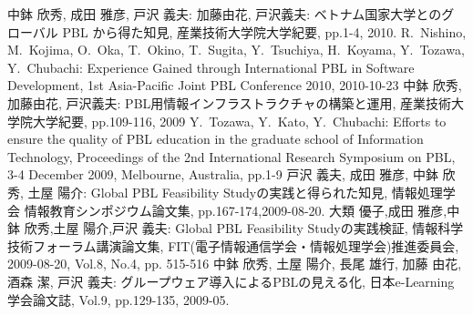 \documentclass[a4j,9pt,twoside,twocolumn]{jsarticle}
\newcommand{\me}{中鉢 欣秀}
\newcommand{\meen}{Y.~Chubachi}
\begin{document}
\begin{thebibliography}{99}
		 \me, 成田 雅彦, 戸沢 義夫: 加藤由花, 戸沢義夫: ベトナム国家大学とのグローバル PBL から得た知見, 産業技術大学院大学紀要, pp.1-4, 2010. 
		 R.~Nishino, M.~Kojima, O.~Oka, T.~Okino, T.~Sugita, Y.~Tsuchiya, H.~Koyama, Y.~Tozawa, \meen: Experience Gained through International PBL in Software Development, 1st Asia-Pacific Joint PBL Conference 2010, 2010-10-23
		 \me, 加藤由花, 戸沢義夫: PBL用情報インフラストラクチャの構築と運用, 産業技術大学院大学紀要, pp.109-116, 2009
		 Y.~Tozawa, Y.~Kato, \meen: Efforts to ensure the quality of PBL education in the graduate school of Information Technology, Proceedings of the 2nd International Research Symposium on PBL, 3-4 December 2009, Melbourne, Australia, pp.1-9
		 戸沢 義夫, 成田 雅彦, \me, 土屋 陽介: Global PBL Feasibility Studyの実践と得られた知見, 情報処理学会 情報教育シンポジウム論文集, pp.167-174,2009-08-20.
		 大類 優子,成田 雅彦,\me,土屋 陽介,戸沢 義夫: Global PBL Feasibility Studyの実践検証, 情報科学技術フォーラム講演論文集, FIT(電子情報通信学会・情報処理学会)推進委員会, 2009-08-20, Vol.8, No.4, pp. 515-516
		 \me, 土屋 陽介, 長尾 雄行, 加藤 由花, 酒森 潔, 戸沢 義夫: グループウェア導入によるPBLの見える化, 日本e-Learning学会論文誌, Vol.9, pp.129-135, 2009-05.

\end{thebibliography}
\end{document}
